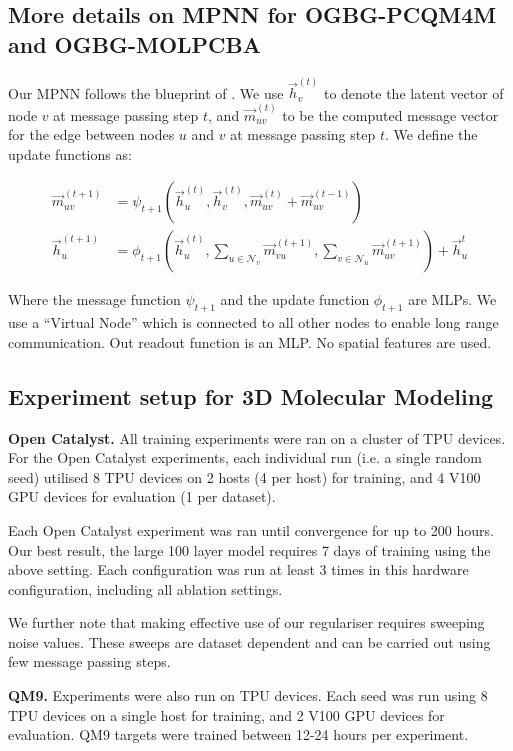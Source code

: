 \documentclass{article} \usepackage{iclr2022_conference,times}
\begin{document}
\subsection{More details on MPNN for OGBG-PCQM4M and OGBG-MOLPCBA}

Our MPNN follows the blueprint of \cite{Gilmer2017NeuralMP}.  We use $\vec{h}^{(t)}_v$ to denote the latent vector of node $v$ at message passing step $t$, and $\vec{m}^{(t)}_{uv}$ to be the computed message vector for the edge between nodes $u$ and $v$ at message passing step $t$.  We define the update functions as:

\begin{align}\label{eqn:mpnn1}
    \vec{m}^{(t+1)}_{uv} &= \psi_{t+1}\left(\vec{h}^{(t)}_u, \vec{h}^{(t)}_v, \vec{m}^{(t)}_{uv} + \vec{m}^{(t-1)}_{uv}\right)\\ \label{eqn:mpnn2}
    \vec{h}^{(t+1)}_u &= \phi_{t+1}\left(\vec{h}^{(t)}_u, \sum_{u\in\mathcal{N}_v}
    \vec{m}^{(t+1)}_{vu},  \sum_{v\in\mathcal{N}_u} \vec{m}^{(t+1)}_{uv}\right) + \vec{h}^{t}_{u}
\end{align}

Where the message function $\psi_{t+1}$ and the update function $\phi_{t+1}$ are MLPs. We use a ``Virtual Node'' which is connected to all other nodes to enable long range communication. Out readout function is an MLP. No spatial features are used.

\subsection{Experiment setup for 3D Molecular Modeling}
\textbf{Open Catalyst.}
All training experiments were ran on a cluster of TPU devices. For the Open Catalyst experiments, each individual run (i.e. a single random seed) utilised 8 TPU devices on 2 hosts (4 per host) for training, and 4 V100 GPU devices for evaluation (1 per dataset). 

Each Open Catalyst experiment was ran until convergence for up to 200 hours. Our best result, the large 100 layer model requires 7 days of training using the above setting. 
Each configuration was run at least 3 times in this hardware configuration, including all ablation settings. 

We further note that making effective use of our regulariser requires sweeping noise values. These sweeps are dataset dependent and can be carried out using few message passing steps.

\textbf{QM9.}
Experiments were also run on TPU devices. Each seed was run using 8 TPU devices on a single host for training, and 2 V100 GPU devices for evaluation. QM9 targets were trained between 12-24 hours per experiment.
\end{document}
